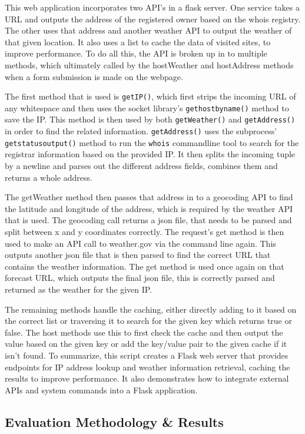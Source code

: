 	This web application incorporates two API's in a flask server. One service takes a URL and outputs the address of the registered owner based on the whois \cite{rfc3912} registry. The other uses that address and another weather API \cite{weather2009national,} to output the weather of that given location. It also uses a list to cache the data of visited sites, to improve performance. To do all this, the API is broken up in to multiple methods, which ultimately called by the hostWeather and hostAddress methods when a form submission is made on the webpage.
	
	The first method that is used is \verb+getIP()+, which first strips the incoming URL of any whitespace and then uses the socket library's \verb+gethostbyname()+ method to save the IP. This method is then used by both \verb+getWeather()+ and \verb+getAddress()+ in order to find the related information. \verb+getAddress()+ uses the subprocess' \verb+getstatusoutput()+ method to run the \verb+whois+ commandline tool to search for the registrar information based on the provided IP. It then splits the incoming tuple by a newline and parses out the different address fields, combines them and returns a whole address. 
	
	The getWeather method then passes that address in to a geocoding API to find the latitude and longitude of the address, which is required by the weather API that is used. The geocoding call returns a json file, that needs to be parsed and split between x and y coordinates correctly. The request's get method is then used to make an API call to weather.gov \cite{weather2009national} via the command line again. This outputs another json file that is then parsed to find the correct URL that contains the weather information. The get method is used once again on that forecast URL, which outputs the final json file, this is correctly parsed and returned as the weather for the given IP.

	The remaining methods handle the caching, either directly adding to it based on the correct list or traversing it to search for the given key which returns true or false. The host methods use this to first check the cache and then output the value based on the given key or add the key/value pair to the given cache if it isn't found. To summarize, this script creates a Flask web server that provides endpoints for IP address lookup and weather information retrieval, caching the results to improve performance. It also demonstrates how to integrate external APIs and system commands into a Flask application.

\subsection{Evaluation Methodology \& Results}

